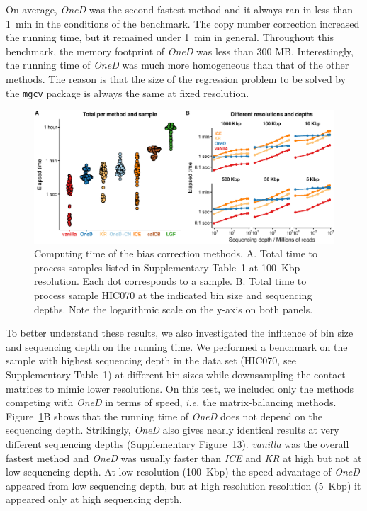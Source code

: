 \documentclass[a4,center,fleqn]{NAR}
\providecommand{\DIFadd}[1]{{\protect\color{red}#1}} %
\providecommand{\DIFdel}[1]{{\protect}}                      %
\providecommand{\DIFaddbegin}{} %
\providecommand{\DIFaddend}{} %
\providecommand{\DIFdelbegin}{} %
\providecommand{\DIFdelend}{} %
\providecommand{\DIFaddFL}[1]{\DIFadd{#1}} %
\begin{document}
\DIFaddbegin \DIFadd{On average, }\DIFaddend \textit{OneD} was the second fastest method and it always ran in less than
1~min in the conditions of the benchmark. \DIFaddbegin \DIFadd{The copy number correction
increased the running time, but it remained under 1~min in general.
}\DIFaddend Throughout this benchmark, the memory footprint of \textit{OneD} was less
than 300 MB.  Interestingly, the running time of \textit{OneD} was much
more homogeneous than that of the other methods. The reason is that the
size of the regression problem to be solved by the \texttt{mgcv} package
is always the same at fixed resolution.

\DIFdelbegin \DIFdel{We also }\DIFdelend \DIFaddbegin \begin{figure}
\centerline{\includegraphics[width=.49\textwidth]
  {nar_figures/figure_6.eps}}
\caption{\DIFaddFL{Computing time of the bias correction methods. A. Total time to
process samples listed in Supplementary Table~1 at 100~Kbp resolution.
Each dot corresponds to a sample. B. Total time to process sample HIC070
at the indicated bin size and sequencing depths. Note the logarithmic
scale on the y-axis on both panels.}}
\label{fig:times}
\end{figure}

\DIFadd{To better understand these results, we also investigated the influence of
bin size and sequencing depth on the running time. We }\DIFaddend performed a
benchmark on \DIFdelbegin \DIFdel{a smaller data set
at increasing
resolution (Figure~\ref{fig:times}B) }\DIFdelend \DIFaddbegin \DIFadd{the sample with highest sequencing depth in the data set
(HIC070, see Supplementary Table~1) at different bin sizes while
downsampling the contact matrices to mimic lower resolutions}\DIFaddend . On this
\DIFdelbegin \DIFdel{benchmark, }\DIFdelend \DIFaddbegin \DIFadd{test, we included only the methods competing with }\textit{\DIFadd{OneD}} \DIFadd{in terms
of speed, }\textit{\DIFadd{i.e.}} \DIFadd{the matrix-balancing methods.
Figure~\ref{fig:times}B shows that the running time of }\textit{\DIFadd{OneD}} \DIFadd{does
not depend on the sequencing depth. Strikingly, }\textit{\DIFadd{OneD}} \DIFadd{also gives
nearly identical results at very different sequencing depths
(Supplementary Figure~13). }\textit{\DIFadd{vanilla}} \DIFadd{was the overall fastest method
and }\textit{\DIFadd{OneD}} \DIFadd{was usually faster than }\DIFaddend \textit{ICE} \DIFdelbegin \DIFdel{ran
slightly faster than }\DIFdelend \DIFaddbegin \DIFadd{and }\textit{\DIFadd{KR}}
\DIFadd{at high but not at low sequencing depth. At low resolution (100~Kbp) the
speed advantage of }\DIFaddend \textit{OneD} \DIFdelbegin \DIFdel{, and the the rank of the methods
remained the same at all resolutions. }\DIFdelend \DIFaddbegin \DIFadd{appeared from low sequencing depth, but
at high resolution resolution (5~Kbp) it appeared only at high sequencing
depth.
}
\end{document}
